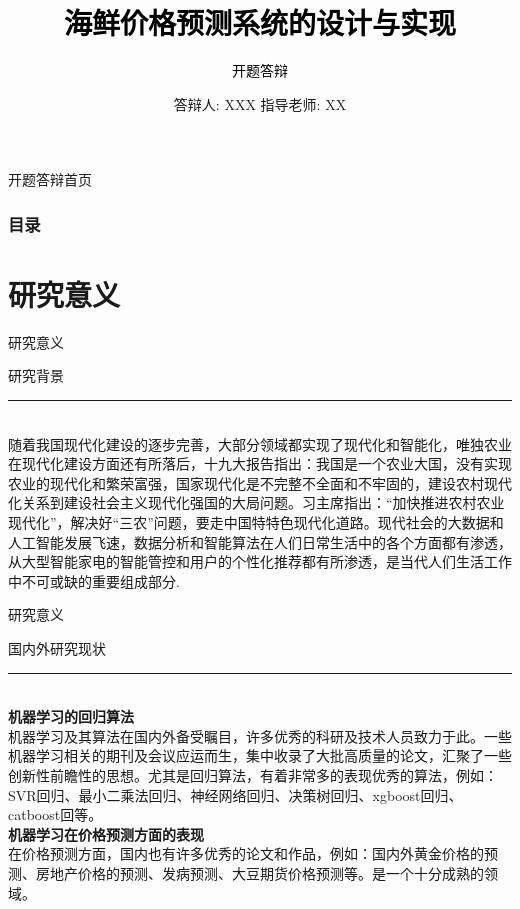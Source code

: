 \documentclass{ctexbeamer}
\title{\textcolor{black}{\textbf{\huge{海鲜价格预测系统的设计与实现}}}}
\subtitle{\textcolor{black}{\LARGE{开题答辩}}}
\author{答辩人: XXX \newline 指导老师: XX  }
\begin{document}
    \begin{frame}[plain]{开题答辩}{首页}
        \titlepage\\
    \end{frame}

    \begin{frame}
        \frametitle{目录}
        \tableofcontents[]
    \end{frame}
    
    \section{研究意义}
    \begin{frame}[plain]{研究意义}
        \begin{center}
            \LARGE{研究背景}
        \end{center}
        \rule[5pt]{10cm}{0.005em}\\
        \normalsize 随着我国现代化建设的逐步完善，大部分领域都实现了现代化和智能化，唯独农业在现代化建设方面还有所落后，十九大报告指出：我国是一个农业大国，没有实现农业的现代化和繁荣富强，国家现代化是不完整不全面和不牢固的，建设农村现代化关系到建设社会主义现代化强国的大局问题。习主席指出：“加快推进农村农业现代化”，解决好“三农”问题，要走中国特特色现代化道路。现代社会的大数据和人工智能发展飞速，数据分析和智能算法在人们日常生活中的各个方面都有渗透，从大型智能家电的智能管控和用户的个性化推荐都有所渗透，是当代人们生活工作中不可或缺的重要组成部分.
    \end{frame}

    \begin{frame}[plain]{研究意义}
        \begin{center}
            \LARGE{国内外研究现状}
        \end{center}
        \rule[5pt]{10cm}{0.005em}\\
        \noindent \large \textbf{机器学习的回归算法} \\
        \small 机器学习及其算法在国内外备受瞩目，许多优秀的科研及技术人员致力于此。一些机器学习相关的期刊及会议应运而生，集中收录了大批高质量的论文，汇聚了一些创新性前瞻性的思想。尤其是回归算法，有着非常多的表现优秀的算法，例如：SVR回归、最小二乘法回归、神经网络回归、决策树回归、xgboost回归、catboost回等。\\
        \noindent \large \textbf{机器学习在价格预测方面的表现} \\
        \small 在价格预测方面，国内也有许多优秀的论文和作品，例如：国内外黄金价格的预测、房地产价格的预测、发病预测、大豆期货价格预测等。是一个十分成熟的领域。\\
    \end{frame}
\end{document}
